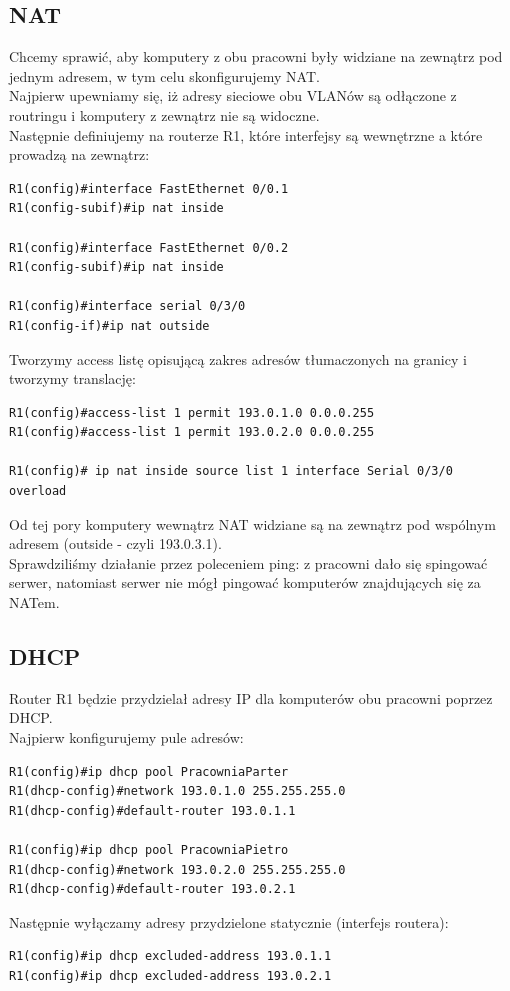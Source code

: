 \documentclass[11pt,a4paper]{article}
\begin{document}
\subsection{NAT}

Chcemy sprawić, aby komputery z obu pracowni były widziane na zewnątrz pod jednym adresem, w tym celu skonfigurujemy NAT.\\
Najpierw upewniamy się, iż adresy sieciowe obu VLANów są odłączone z routringu i komputery z zewnątrz nie są widoczne.\\
Następnie definiujemy na routerze R1, które interfejsy są wewnętrzne a które prowadzą na zewnątrz:
\begin{lstlisting}
R1(config)#interface FastEthernet 0/0.1
R1(config-subif)#ip nat inside

R1(config)#interface FastEthernet 0/0.2
R1(config-subif)#ip nat inside

R1(config)#interface serial 0/3/0
R1(config-if)#ip nat outside
\end{lstlisting}
Tworzymy access listę opisującą zakres adresów tłumaczonych na granicy i tworzymy translację:
\begin{lstlisting}
R1(config)#access-list 1 permit 193.0.1.0 0.0.0.255
R1(config)#access-list 1 permit 193.0.2.0 0.0.0.255

R1(config)# ip nat inside source list 1 interface Serial 0/3/0 overload
\end{lstlisting}
Od tej pory komputery wewnątrz NAT widziane są na zewnątrz pod wspólnym adresem (outside - czyli 193.0.3.1).\\
Sprawdziliśmy działanie przez poleceniem ping: z pracowni dało się spingować serwer, natomiast serwer nie mógł pingować komputerów znajdujących się za NATem.
 

\subsection{DHCP}
Router R1 będzie przydzielał adresy IP dla komputerów obu pracowni poprzez DHCP.\\
Najpierw konfigurujemy pule adresów:
\begin{lstlisting}
R1(config)#ip dhcp pool PracowniaParter
R1(dhcp-config)#network 193.0.1.0 255.255.255.0
R1(dhcp-config)#default-router 193.0.1.1

R1(config)#ip dhcp pool PracowniaPietro
R1(dhcp-config)#network 193.0.2.0 255.255.255.0
R1(dhcp-config)#default-router 193.0.2.1
\end{lstlisting}
Następnie wyłączamy adresy przydzielone statycznie (interfejs routera):
\begin{lstlisting}
R1(config)#ip dhcp excluded-address 193.0.1.1
R1(config)#ip dhcp excluded-address 193.0.2.1
\end{lstlisting}
\end{document}

